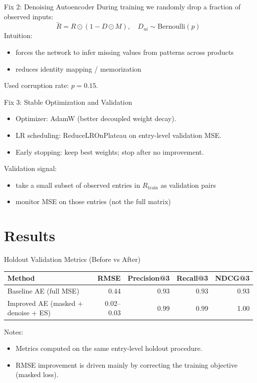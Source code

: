 \documentclass[aspectratio=169]{beamer}
\begin{document}
\begin{frame}{Fix 2: Denoising Autoencoder}
	During training we randomly drop a fraction of observed inputs:
	\[
		\tilde{R} = R \odot (1 - D \odot M), \quad D_{ui} \sim \text{Bernoulli}(p)
	\]
	\vspace{0.5em}
	Intuition:
	\begin{itemize}
		\item forces the network to infer missing values from patterns across products
		\item reduces identity mapping / memorization
	\end{itemize}
	\vspace{0.5em}
	Used corruption rate: $p=0.15$.
\end{frame}

\begin{frame}{Fix 3: Stable Optimization and Validation}
	\begin{itemize}
		\item Optimizer: AdamW (better decoupled weight decay).
		\item LR scheduling: ReduceLROnPlateau on entry-level validation MSE.
		\item Early stopping: keep best weights; stop after no improvement.
	\end{itemize}
	\vspace{0.5em}
	Validation signal:
	\begin{itemize}
		\item take a small subset of observed entries in $R_{\text{train}}$ as validation pairs
		\item monitor MSE on those entries (not the full matrix)
	\end{itemize}
\end{frame}

\section{Results}

\begin{frame}{Holdout Validation Metrics (Before vs After)}
	\begin{table}
		\centering
		\begin{tabular}{lrrrr}
			\toprule
			Method                              & RMSE       & Precision@3 & Recall@3 & NDCG@3 \\
			\midrule
			Baseline AE (full MSE)              & 0.44       & 0.93        & 0.93     & 0.93   \\
			Improved AE (masked + denoise + ES) & 0.02--0.03 & 0.99        & 0.99     & 1.00   \\
			\bottomrule
		\end{tabular}
	\end{table}
	\vspace{0.5em}
	Notes:
	\begin{itemize}
		\item Metrics computed on the same entry-level holdout procedure.
		\item RMSE improvement is driven mainly by correcting the training objective (masked loss).
	\end{itemize}
\end{frame}
\end{document}
